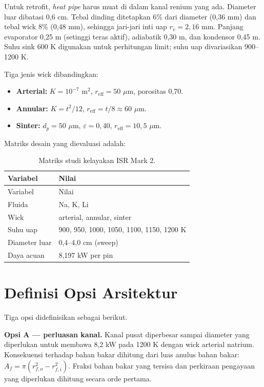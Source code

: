 \documentclass[
  indonesian,
  12pt,
  a4paper,
]{report}
\providecommand{\tightlist}{%
  \setlength{\itemsep}{0pt}\setlength{\parskip}{0pt}}
\begin{document}
Untuk retrofit, \emph{heat pipe} harus muat di dalam kanal renium yang
ada. Diameter luar dibatasi 0,6 cm. Tebal dinding ditetapkan 6\% dari
diameter (0,36 mm) dan tebal wick 8\% (0,48 mm), sehingga jari-jari inti
uap \(r_v=2{,}16\) mm. Panjang evaporator 0,25 m (setinggi teras aktif),
adiabatik 0,30 m, dan kondensor 0,45 m. Suhu sink 600 K digunakan untuk
perhitungan limit; suhu uap divariasikan 900--1200 K.

Tiga jenis wick dibandingkan:

\begin{itemize}
\tightlist
\item
  \textbf{Arterial:} \(K=10^{-7}\) m\(^2\), \(r_{\mathrm{eff}}=50\)
  \(\mu\)m, porositas 0,70.
\item
  \textbf{Annular:} \(K=t^2/12\), \(r_{\mathrm{eff}}=t/8\approx60\)
  \(\mu\)m.
\item
  \textbf{Sinter:} \(d_p=50\) \(\mu\)m, \(\varepsilon=0{,}40\),
  \(r_{\mathrm{eff}}=10{,}5\) \(\mu\)m.
\end{itemize}

Matriks desain yang dievaluasi adalah:

\begin{longtable}[]{@{}ll@{}}
\caption{Matriks studi kelayakan ISR Mark
2.}\label{tbl-matrix}\tabularnewline
\toprule\noalign{}
Variabel & Nilai \\
\midrule\noalign{}
\endfirsthead
\toprule\noalign{}
Variabel & Nilai \\
\midrule\noalign{}
\endhead
\bottomrule\noalign{}
\endlastfoot
Fluida & Na, K, Li \\
Wick & arterial, annular, sinter \\
Suhu uap & 900, 950, 1000, 1050, 1100, 1150, 1200 K \\
Diameter luar & 0,4--4,0 cm (sweep) \\
Daya acuan & 8,197 kW per pin \\
\end{longtable}

\section{Definisi Opsi Arsitektur}\label{definisi-opsi-arsitektur}

Tiga opsi didefinisikan sebagai berikut.

\textbf{Opsi A --- perluasan kanal.} Kanal pusat diperbesar sampai
diameter yang diperlukan untuk membawa 8,2 kW pada 1200 K dengan wick
arterial natrium. Konsekuensi terhadap bahan bakar dihitung dari luas
anulus bahan bakar: \(A_f=\pi(r_{f,o}^2-r_{f,i}^2)\). Fraksi bahan bakar
yang tersisa dan perkiraan pengayaan yang diperlukan dihitung secara
orde pertama.
\end{document}
